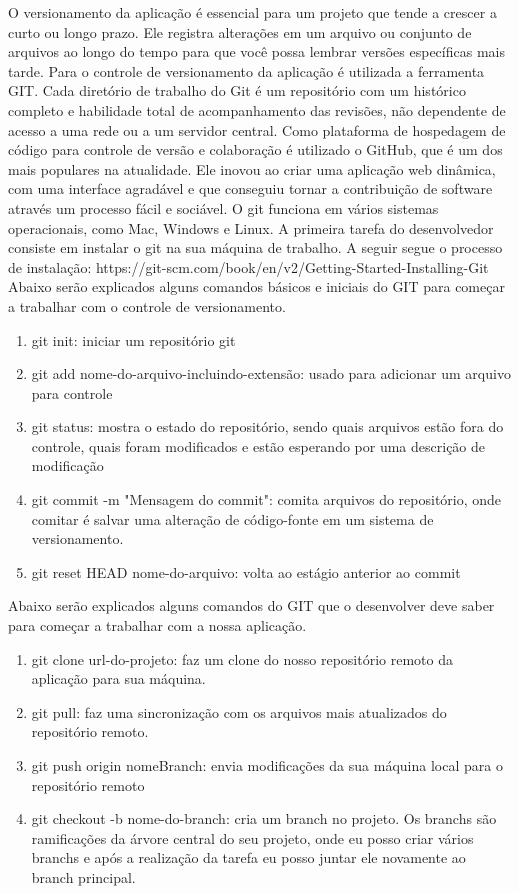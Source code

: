 \documentclass[	DIV=calc,%
							paper=a4,%
							fontsize=12pt,%
							onecolumn]{scrartcl}	 					%
\begin{document}
O versionamento da aplicação é essencial para um projeto que tende a crescer a curto ou longo
prazo. Ele registra alterações em um arquivo ou conjunto de arquivos ao longo do tempo para que você
possa lembrar versões específicas mais tarde.
Para o controle de versionamento da aplicação é utilizada a ferramenta GIT. Cada diretório de
trabalho do Git é um repositório com um histórico completo e habilidade total de acompanhamento das
revisões, não dependente de acesso a uma rede ou a um servidor central.
Como plataforma de hospedagem de código para controle de versão e colaboração é utilizado o
GitHub, que é um dos mais populares na atualidade. Ele inovou ao criar uma aplicação web dinâmica,
com uma interface agradável e que conseguiu tornar a contribuição de software através um processo
fácil e sociável.
O git funciona em vários sistemas operacionais, como Mac, Windows e Linux. A primeira tarefa
do desenvolvedor consiste em instalar o git na sua máquina de trabalho. A seguir segue o processo de
instalação: https://git-scm.com/book/en/v2/Getting-Started-Installing-Git
Abaixo serão explicados alguns comandos básicos e iniciais do GIT para começar a trabalhar com
o controle de versionamento.


\begin{enumerate}
	\item git init: iniciar um repositório git
	\item git add nome-do-arquivo-incluindo-extensão: usado para adicionar um arquivo para controle
	\item git status: mostra o estado do repositório, sendo quais arquivos estão fora do controle, quais
	foram modificados e estão esperando por uma descrição de modificação
	\item git commit -m "Mensagem do commit": comita arquivos do repositório, onde comitar é salvar
	uma alteração de código-fonte em um sistema de versionamento.
	\item git reset HEAD nome-do-arquivo: volta ao estágio anterior ao commit
\end{enumerate}

Abaixo serão explicados alguns comandos do GIT que o desenvolver deve saber para começar a
trabalhar com a nossa aplicação.


\begin{enumerate}
	\item git clone url-do-projeto: faz um clone do nosso repositório remoto da aplicação para sua
	máquina.
	\item git pull: faz uma sincronização com os arquivos mais atualizados do repositório remoto.
	\item git push origin nomeBranch: envia modificações da sua máquina local para o repositório
	remoto
	\item git checkout -b nome-do-branch: cria um branch no projeto. Os branchs são ramificações da
	árvore central do seu projeto, onde eu posso criar vários branchs e após a realização da tarefa eu
	posso juntar ele novamente ao branch principal.
\end{enumerate}
\end{document}
